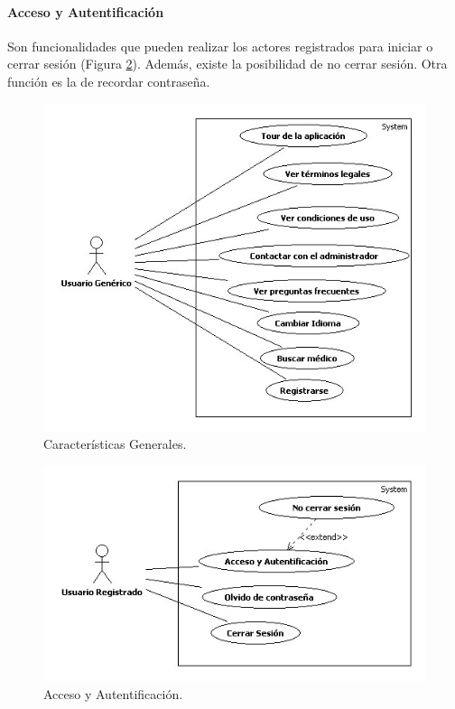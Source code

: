 \documentclass[a4paper,oneside,11pt]{book}
\begin{document}
		
			\paragraph{Acceso y Autentificación} %
			\label{par:acceso_y_autentificacion}
				Son funcionalidades que pueden realizar los actores registrados para iniciar o cerrar sesión (Figura \ref{fig:acceso}). Además, existe la posibilidad de no cerrar sesión. Otra función es la de recordar contraseña.
				\begin{figure}[H]
				  \centering
				    \includegraphics[width=12cm]{img/jpg/casos_uso/Generales.jpg}
				  \caption{Características Generales.}
				  \label{fig:caracteristicas}
				\end{figure}
				
				\begin{figure}[H]
				  \centering
				    \includegraphics[width=12cm]{img/jpg/casos_uso/Acceso_y_Autentificacion.jpg}
				  \caption{Acceso y Autentificación.}
				  \label{fig:acceso}
				\end{figure}
			
\end{document}
